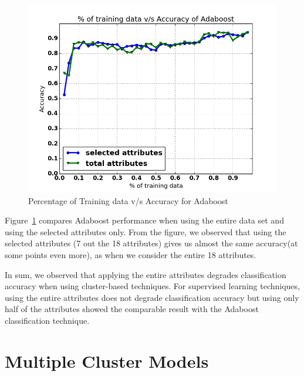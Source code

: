 \documentclass[conference]{IEEEtran}
\begin{document}
\begin{figure}[!t]
	\centering
	\includegraphics[width=1\columnwidth]{selected_total_attr_adaboost}
	\caption{Percentage of Training data v/s Accuracy for Adaboost}
	\label{adaboost_selected_total}
\end{figure}

Figure~\ref{adaboost_selected_total} compares Adaboost performance when using the entire data set and using the selected attributes only. 
From the figure, we observed that using the selected attributes (7 out the 18 attributes) gives us almost the same accuracy(at some points even more), as when we consider the entire 18 attributes. 

In sum, we observed that applying the entire attributes degrades classification accuracy when using cluster-based techniques.
For supervised learning techniques, using the entire attributes does not degrade classification accuracy but using only half of the attributes showed the comparable result with the Adaboost classification technique.


\section{Multiple Cluster Models}
\label{sec:multi_cluster}
\end{document}
